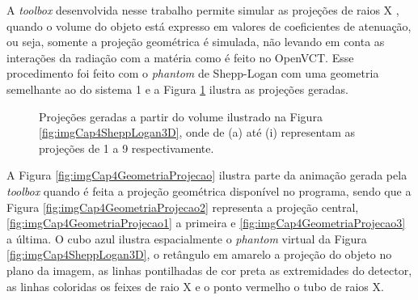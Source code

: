 A \textit{toolbox} desenvolvida nesse trabalho permite simular as projeções de raios X , quando o volume do objeto está expresso em valores de coeficientes de atenuação, ou seja, somente a projeção geométrica é simulada, não levando em conta as interações da radiação com a matéria como é feito no OpenVCT. Esse procedimento foi feito com o \textit{phantom} de Shepp-Logan com uma geometria semelhante ao do sistema 1 e a Figura \ref{fig:imgCap4Projecoes} ilustra as projeções geradas.

\begin{figure}[H]
	\centering
	
	\caption{Projeções geradas a partir do volume ilustrado na Figura \ref{fig:imgCap4SheppLogan3D}, onde de (a) até (i) representam as projeções de 1 a 9 respectivamente.}
	
	
	\label{fig:imgCap4Projecoes}
\end{figure}

 
A Figura \ref{fig:imgCap4GeometriaProjecao} ilustra parte da animação gerada pela \textit{toolbox} quando é feita a projeção geométrica  disponível no programa, sendo que a Figura \ref{fig:imgCap4GeometriaProjecao2} representa a projeção central, \ref{fig:imgCap4GeometriaProjecao1} a primeira e \ref{fig:imgCap4GeometriaProjecao3} a última. O cubo azul ilustra espacialmente o \textit{phantom} virtual da Figura \ref{fig:imgCap4SheppLogan3D}, o retângulo em amarelo a projeção do objeto no plano da imagem, as linhas pontilhadas de cor preta as extremidades do detector, as linhas coloridas os feixes de raio X  e o ponto vermelho o tubo de raios X. 

